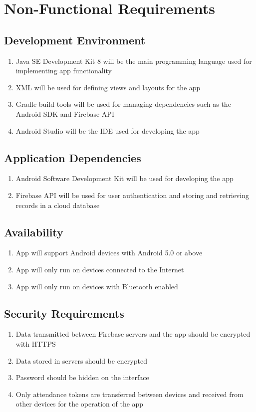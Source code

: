 \documentclass[../report.tex]{subfiles}
\begin{document}
\section{Non-Functional Requirements}
\subsection{Development Environment}
\begin{enumerate}
\item Java SE Development Kit 8 will be the main programming language used for implementing app functionality
\item XML will be used for defining views and layouts for the app
\item Gradle build tools will be used for managing dependencies such as the Android SDK and Firebase API
\item Android Studio will be the IDE used for developing the app
\end{enumerate}

\subsection{Application Dependencies}
\begin{enumerate}
\item Android Software Development Kit will be used for developing the app
\item Firebase API will be used for user authentication and storing and retrieving records in a cloud database
\end{enumerate}

\subsection{Availability}
\begin{enumerate}
\item App will support Android devices with Android 5.0 or above
\item App will only run on devices connected to the Internet
\item App will only run on devices with Bluetooth enabled
\end{enumerate}

\subsection{Security Requirements}
\begin{enumerate}
\item Data transmitted between Firebase servers and the app should be encrypted with HTTPS
\item Data stored in servers should be encrypted
\item Password should be hidden on the interface
\item Only attendance tokens are transferred between devices and received from other devices for the operation of the app
\end{enumerate}
\end{document}
